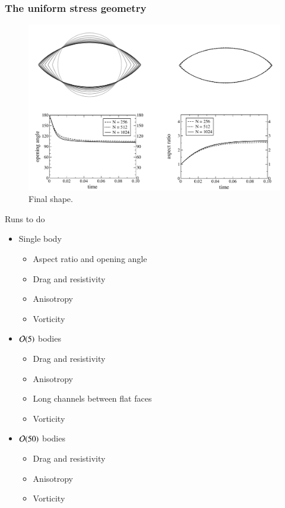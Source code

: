 \documentclass[preprint, 10pt]{elsarticle}
\begin{document}
\subsubsection{The uniform stress geometry}


\newpage


\begin{figure}%
\begin{center}
\includegraphics[width = 0.99 \textwidth]{./figs/fig4.pdf}
\caption{Final shape.}
\label{fig2}
\end{center}
\end{figure}

Runs to do
\begin{itemize}
  \item Single body
  \begin{itemize}
    \item Aspect ratio and opening angle
    \item Drag and resistivity
    \item Anisotropy
    \item Vorticity
  \end{itemize}
  \item ${\mathcal{O}}(5)$ bodies
  \begin{itemize}
    \item Drag and resistivity
    \item Anisotropy
    \item Long channels between flat faces
    \item Vorticity
  \end{itemize}
  \item ${\mathcal{O}}(50)$ bodies
  \begin{itemize}
    \item Drag and resistivity
    \item Anisotropy
    \item Vorticity
  \end{itemize}
\end{itemize}
\end{document}

